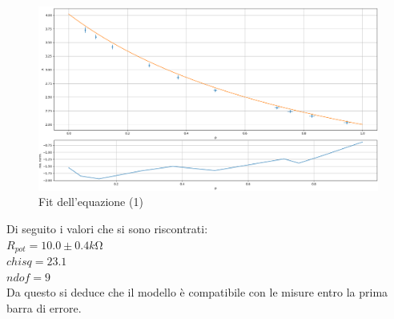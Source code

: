 \documentclass[10pt, a4paper, italian]{article}
\begin{document}
\begin{figure}[H]
    \centering
	\includegraphics[scale=0.4]{arinzarunza}
    \caption{Fit dell'equazione (1)
    \label{fig: Draft1}}
\end{figure}
Di seguito i valori che si sono riscontrati:\\
$R_{pot}=10.0 \pm 0.4 \si{k\ohm}$\\$chisq=23.1$\\$ndof=9$\\
Da questo si deduce che il modello è compatibile con le misure entro la prima barra di errore.
\end{document}
